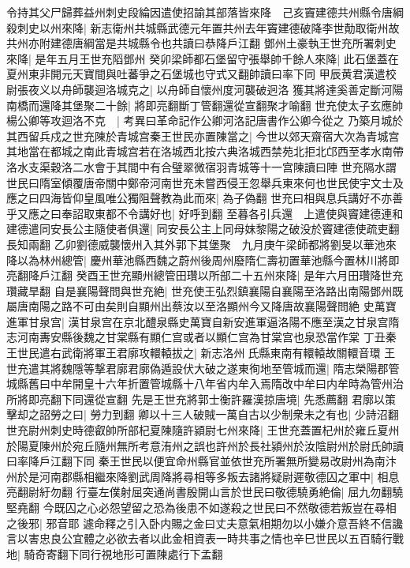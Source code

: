 令持其父尸歸葬益州刺史段綸因遣使招諭其部落皆來降　己亥竇建德共州縣令唐綱殺刺史以州來降|{
	新志衛州共城縣武德元年置共州去年竇建德破降李世勣取衛州故共州亦附建德唐綱當是共城縣令也共讀曰恭降戶江翻}
鄧州土豪執王世充所署刺史來降|{
	是年五月王世充䧟鄧州}
癸卯梁師都石堡留守張舉帥千餘人來降|{
	此石堡蓋在夏州東非開元天寶間與吐蕃爭之石堡城也守式又翻帥讀曰率下同}
甲辰黄君漢遣校尉張夜义以舟師襲迴洛城克之|{
	以舟師自懷州度河襲破迥洛}
獲其將達奚善定斷河陽南橋而還降其堡聚二十餘|{
	將即亮翻斷丁管翻還從宣翻聚才喻翻}
世充使太子玄應帥楊公卿等攻迴洛不克　|{
	考異曰革命記作公卿河洛記唐書作公卿今從之}
乃築月城於其西留兵戍之世充陳於青城宫秦王世民亦置陳當之|{
	今世以郊天齋宿大次為青城宫其地當在都城之南此青城宫若在洛城西北按六典洛城西禁苑北拒北邙西至孝水南帶洛水支渠穀洛二水會于其間中有合璧翠微宿羽青城等十一宫陳讀曰陣}
世充隔水謂世民曰隋室傾覆唐帝關中鄭帝河南世充未嘗西侵王忽舉兵東來何也世民使宇文士及應之曰四海皆仰皇風唯公獨阻聲教為此而來|{
	為子偽翻}
世充曰相與息兵講好不亦善乎又應之曰奉詔取東都不令講好也|{
	好呼到翻}
至暮各引兵還　上遣使與竇建德連和建德遣同安長公主隨使者俱還|{
	同安長公主上同母妺黎陽之破没於竇建德使疏吏翻長知兩翻}
乙卯劉德威襲懷州入其外郭下其堡聚　九月庚午梁師都將劉旻以華池來降以為林州總管|{
	慶州華池縣西魏之蔚州後周州廢隋仁壽初置華池縣今置林川將即亮翻降戶江翻}
癸酉王世充顯州總管田瓚以所部二十五州來降|{
	是年六月田瓚降世充瓚藏旱翻}
自是襄陽聲問與世充絶|{
	世充使王弘烈鎮襄陽自襄陽至洛路出南陽鄧州既屬唐南陽之路不可由矣則自顯州出蔡汝以至洛顯州今又降唐故襄陽聲問絶}
史萬寶進軍甘泉宫|{
	漢甘泉宫在京北醴泉縣史萬寶自新安進軍逼洛陽不應至漢之甘泉宫隋志河南夀安縣後魏之甘棠縣有顯仁宫或者以顯仁宫為甘棠宫也泉恐當作棠}
丁丑秦王世民遣右武衛將軍王君廓攻轘轅拔之|{
	新志洛州氏縣東南有轘轅故關轘音環}
王世充遣其將魏隱等撃君廓君廓偽遁設伏大破之遂東徇地至管城而還|{
	隋志榮陽郡管城縣舊曰中牟開皇十六年折置管城縣十八年省内牟入焉隋改中牟曰内牟時為管州治所將即亮翻下同還從宣翻}
先是王世充將郭士衡許羅漢掠唐境|{
	先悉薦翻}
君廓以策擊却之詔勞之曰|{
	勞力到翻}
卿以十三人破賊一萬自古以少制衆未之有也|{
	少詩沼翻}
世充尉州刺史時德叡帥所部杞夏陳隨許潁尉七州來降|{
	王世充蓋置杞州於雍丘夏州於陽夏陳州於宛丘隨州無所考意洧州之誤也許州於長社潁州於汝陰尉州於尉氏帥讀曰率降戶江翻下同}
秦王世民以便宜命州縣官並依世充所署無所變易改尉州為南汴州於是河南郡縣相繼來降劉武周降將尋相等多叛去諸將疑尉遲敬德囚之軍中|{
	相息亮翻尉紆勿翻}
行臺左僕射屈突通尚書殷開山言於世民曰敬德驍勇絶倫|{
	屈九勿翻驍堅堯翻}
今既囚之心必怨望留之恐為後患不如遂殺之世民曰不然敬德若叛豈在尋相之後邪|{
	邪音耶}
遽命釋之引入卧内賜之金曰丈夫意氣相期勿以小嫌介意吾終不信讒言以害忠良公宜體之必欲去者以此金相資表一時共事之情也辛巳世民以五百騎行戰地|{
	騎奇寄翻下同行視地形可置陳處行下孟翻}

